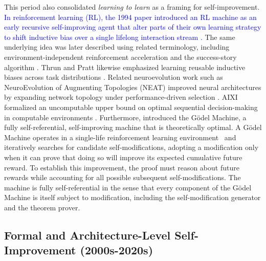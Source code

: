 This period also consolidated \textit{learning to learn} as a framing for self-improvement. \textcolor{blue}{In reinforcement learning (RL), the 1994 paper introduced an RL machine as an early recursive self-improving agent that alter parts of their own learning strategy to shift inductive bias over a single lifelong interaction stream \citep{Schmidhuber1994OnLH}.} 
The same underlying idea was later described using related terminology, including environment-independent reinforcement acceleration and the success-story algorithm \citep{DBLP:conf/icml/WieringS96, schmidhuber1996simple, schmidhuber1996multi, schmidhuber1997shifting}. Thrun and Pratt likewise emphasized learning reusable inductive biases across task distributions \citep{thrun1998learning}. Related neuroevolution work such as NeuroEvolution of Augmenting Topologies (NEAT) improved neural architectures by expanding network topology under performance-driven selection \citep{stanley2002evolving}. AIXI formalized an uncomputable upper bound on optimal sequential decision-making in computable environments \citep{hutter2000theoryuniversalartificialintelligence}. Furthermore, \citet{schmidhuber2003godel} introduced the G\"odel Machine, a fully self-referential, self-improving machine that is theoretically optimal. A G\"odel Machine operates in a single-life reinforcement learning environment~\citep{Schmidhuber1994OnLH} and iteratively searches for candidate self-modifications, adopting a modification only when it can prove that doing so will improve its expected cumulative future reward. To establish this improvement, the proof must reason about future rewards while accounting for all possible subsequent self-modifications. The machine is fully self-referential in the sense that every component of the G\"odel Machine is itself subject to modification, including the self-modification generator and the theorem prover.


\subsection{Formal and Architecture-Level Self-Improvement (2000s-2020s)}

